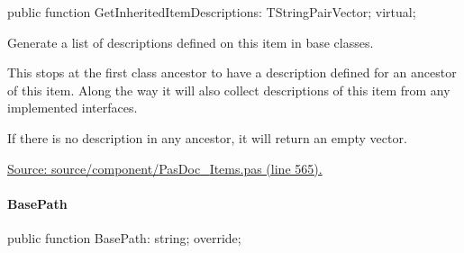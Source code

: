 \documentclass{report}
\newif\ifpdf
\begin{document}
\label{PasDoc_Items.TPasItem-GetInheritedItemDescriptions}
\begin{list}{}{
\setlength{\itemindent}{0cm}
\setlength{\listparindent}{0cm}
\setlength{\leftmargin}{\evensidemargin}
\addtolength{\leftmargin}{\tmplength}
\settowidth{\labelsep}{X}
\addtolength{\leftmargin}{\labelsep}
\setlength{\labelwidth}{\tmplength}
}
\item[\textbf{Declaration}\hfill]
\ifpdf
\begin{flushleft}
\fi
\begin{ttfamily}
public function GetInheritedItemDescriptions: TStringPairVector; virtual;\end{ttfamily}

\ifpdf
\end{flushleft}
\fi

\par
\item[\textbf{Description}]
Generate a list of descriptions defined on this item in base classes.

This stops at the first class ancestor to have a description defined for an ancestor of this item. Along the way it will also collect descriptions of this item from any implemented interfaces.

If there is no description in any ancestor, it will return an empty vector.\par
\href{https://github.com/pasdoc/pasdoc/blob/master/source/component/PasDoc_Items.pas#L565}{Source: source/component/PasDoc{\_}Items.pas (line 565).}

\end{list}
\paragraph*{BasePath}\hspace*{\fill}

\label{PasDoc_Items.TPasItem-BasePath}
\begin{list}{}{
\setlength{\itemindent}{0cm}
\setlength{\listparindent}{0cm}
\setlength{\leftmargin}{\evensidemargin}
\addtolength{\leftmargin}{\tmplength}
\settowidth{\labelsep}{X}
\addtolength{\leftmargin}{\labelsep}
\setlength{\labelwidth}{\tmplength}
}
\item[\textbf{Declaration}\hfill]
\ifpdf
\begin{flushleft}
\fi
\begin{ttfamily}
public function BasePath: string; override;\end{ttfamily}

\ifpdf
\end{flushleft}
\fi

\end{list}
\end{document}

